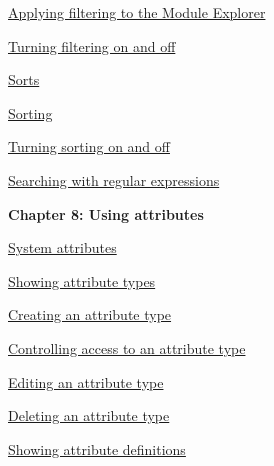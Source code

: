 \documentclass[11pt,a4paper]{article}
\begin{document}
\href{https://www.ibm.com/support/knowledgecenter/search/Applying%20filtering%20to%20the%20Module%20Explorer?scope=SSYQBZ_9.6.1}{Applying filtering to the Module Explorer}

\href{https://www.ibm.com/support/knowledgecenter/search/Turning%20filtering%20on%20and%20off?scope=SSYQBZ_9.6.1}{Turning filtering on and off}

\href{https://www.ibm.com/support/knowledgecenter/search/Sorts?scope=SSYQBZ_9.6.1}{Sorts}

\href{https://www.ibm.com/support/knowledgecenter/search/Sorting?scope=SSYQBZ_9.6.1}{Sorting}

\href{https://www.ibm.com/support/knowledgecenter/search/Turning%20sorting%20on%20and%20off?scope=SSYQBZ_9.6.1}{Turning sorting on and off}

\href{https://www.ibm.com/support/knowledgecenter/search/Searching%20with%20regular%20expressions?scope=SSYQBZ_9.6.1}{Searching with regular expressions} \\



\begin{Large}\textbf{Chapter 8: Using attributes} \end{Large} 
\vspace{1mm}

\href{https://www.ibm.com/support/knowledgecenter/search/System%20attributes?scope=SSYQBZ_9.6.1}{System attributes}


\href{https://www.ibm.com/support/knowledgecenter/search/Showing%20attribute%20types?scope=SSYQBZ_9.6.1}{Showing attribute types}

\href{https://www.ibm.com/support/knowledgecenter/search/Creating%20an%20attribute%20type?scope=SSYQBZ_9.6.1}{Creating an attribute type}

\href{https://www.ibm.com/support/knowledgecenter/search/Controlling%20access%20to%20an%20attribute%20type?scope=SSYQBZ_9.6.1}{Controlling access to an attribute type}

\href{https://www.ibm.com/support/knowledgecenter/search/Editing%20an%20attribute%20type?scope=SSYQBZ_9.6.1}{Editing an attribute type}

\href{https://www.ibm.com/support/knowledgecenter/search/Deleting%20an%20attribute%20type?scope=SSYQBZ_9.6.1}{Deleting an attribute type}

\href{https://www.ibm.com/support/knowledgecenter/search/Showing%20attribute%20definitions?scope=SSYQBZ_9.6.1}{Showing attribute definitions}
\end{document}

